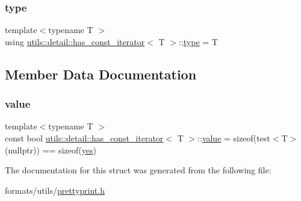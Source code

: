 \subsubsection{\texorpdfstring{type}{type}}
{\footnotesize\ttfamily template$<$typename T $>$ \\
using \mbox{\hyperlink{structutils_1_1detail_1_1has__const__iterator}{utils\+::detail\+::has\+\_\+const\+\_\+iterator}}$<$ T $>$\+::\mbox{\hyperlink{structutils_1_1detail_1_1has__const__iterator_ab04a52bc09ea50fb7c36012650b6b898}{type}} =  T}



\subsection{Member Data Documentation}
\mbox{\label{structutils_1_1detail_1_1has__const__iterator_aae38c1a33d1fe863e1e34a0c5054bc69}} 
\subsubsection{\texorpdfstring{value}{value}}
{\footnotesize\ttfamily template$<$typename T $>$ \\
const bool \mbox{\hyperlink{structutils_1_1detail_1_1has__const__iterator}{utils\+::detail\+::has\+\_\+const\+\_\+iterator}}$<$ T $>$\+::\mbox{\hyperlink{diffusion_8cpp_a4b41795815d9f3d03abfc739e666d5da}{value}} = sizeof(test$<$T$>$(nullptr)) == sizeof(\mbox{\hyperlink{structutils_1_1detail_1_1sfinae__base_ad5567f856d8b9af7d1af85c2555ce0e5}{yes}})\hspace{0.3cm}{\ttfamily [static]}}



The documentation for this struct was generated from the following file\+:\begin{DoxyCompactItemize}
\item 
formats/utils/\mbox{\hyperlink{prettyprint_8h}{prettyprint.\+h}}\end{DoxyCompactItemize}
